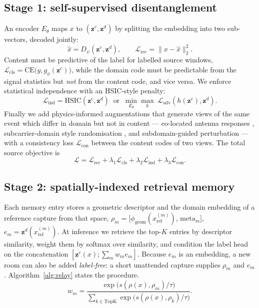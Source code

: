 \documentclass[conference]{IEEEtran}
\newcommand{\zc}{\mathbf{z}^{c}}      %
\newcommand{\zd}{\mathbf{z}^{d}}      %
\begin{document}
\subsection{Stage 1: self-supervised disentanglement}
An encoder $E_\theta$ maps $x$ to $(\zc,\zd)$ by splitting the embedding into two
sub-vectors, decoded jointly:
\begin{equation}
\hat{x} = D_\psi(\zc, \zd), \qquad
\mathcal{L}_{\mathrm{rec}} = \|x-\hat{x}\|_2^2 .
\end{equation}
Content must be predictive of the label for labelled source windows,
$\mathcal{L}_{\mathrm{cls}} = \mathrm{CE}\big(y, g_\phi(\zc)\big)$, while the domain code
must be predictable from the signal statistics but \emph{not} from the content code, and
vice versa. We enforce statistical independence with an HSIC-style penalty:
\begin{equation}
\mathcal{L}_{\mathrm{ind}} = \mathrm{HSIC}(\zc, \zd) \;\; \text{or} \;\;
\min_{E_\theta}\max_{h}\ \mathcal{L}_{\mathrm{adv}}(h(\zc),\zd).
\end{equation}
Finally we add physics-informed augmentations that generate views of the same event which
differ in domain but not in content --- co-located antenna responses
\cite{Xu2023ARCFi}, subcarrier-domain style randomisation \cite{Liu2024WiSR}, and
subdomain-guided perturbation \cite{Liu2024WiSGP} --- with a consistency loss
$\mathcal{L}_{\mathrm{con}}$ between the content codes of two views. The total source
objective is
\begin{equation}
\mathcal{L} = \mathcal{L}_{\mathrm{rec}} + \lambda_1 \mathcal{L}_{\mathrm{cls}}
+ \lambda_2 \mathcal{L}_{\mathrm{ind}} + \lambda_3 \mathcal{L}_{\mathrm{con}} .
\label{eq:total}
\end{equation}

\subsection{Stage 2: spatially-indexed retrieval memory}
Each memory entry stores a geometric descriptor and the domain embedding of a reference
capture from that space,
$\rho_m = \big[\phi_{\mathrm{geom}}(x^{(m)}_{\mathrm{ref}}),\, \text{meta}_m\big]$,
$e_m = \zd(x^{(m)}_{\mathrm{ref}})$. At inference we retrieve the top-$K$ entries by
descriptor similarity, weight them by softmax over similarity, and condition the label
head on the concatenation $[\zc(x); \sum_m w_m e_m]$. Because $e_m$ is an embedding, a new
room can also be added \emph{label-free}: a short unattended capture supplies $\rho_m$ and
$e_m$. Algorithm~\ref{alg:relay} states the procedure.
\begin{equation}
w_m = \frac{\exp\!\big(s(\rho(x),\rho_m)/\tau\big)}{\sum_{k\in\mathrm{TopK}}\exp\!\big(s(\rho(x),\rho_k)/\tau\big)} .
\end{equation}
\end{document}
